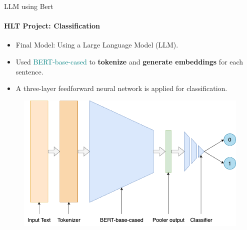 \documentclass{beamer}
\theoremstyle{definition}
\theoremstyle{plain}
\begin{document}
\begin{frame}{LLM using Bert}
\framesubtitle{HLT Project: Classification}
{\small
\vspace{-0.1cm}
\begin{itemize}
    \item Final Model: Using a Large Language Model (LLM).
    \item Used \textcolor{teal}{BERT-base-cased} to \textbf{tokenize} and \textbf{generate embeddings} for each sentence.
    \item A three-layer feedforward neural network is applied for classification.
\end{itemize}
}

\begin{figure}
    \centering
    \includegraphics[scale=0.3]{Figures/Model.png}
\end{figure}
\end{frame}
\end{document}
